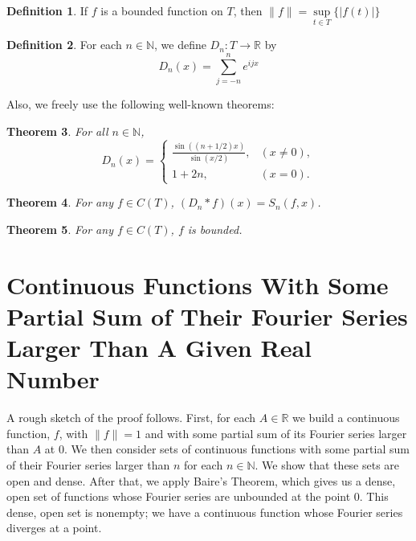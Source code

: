 \documentclass{amsart}
\newcommand{\N}{\mathbb{N}}
\newcommand{\R}{\mathbb{R}}
\newcommand{\absval}[1]{\left| #1 \right|}
\newcommand{\norm}[1]{\|#1\|}
\newtheorem{thm}{Theorem}[section]
\theoremstyle{definition}
\newtheorem{definition}[thm]{Definition}
\begin{document}
\begin{definition}
If $f$ is a bounded function on $T$, then $\norm{f} = \sup\limits_{t \in T} \{\absval{f(t)}\}$
\end{definition}

\begin{definition}
For each $n \in \N$, we define $D_n: T \to \R$ by
\begin{displaymath}
   D_n(x) = \sum\limits_{j=-n}^n e^{ijx}
\end{displaymath} 
\end{definition}




Also, we freely use the following well-known theorems:

\begin{thm}
For all $n \in \N$, 
\begin{displaymath}
   D_n(x) = \left\{
     \begin{array}{lr}
       \frac{\sin((n+1/2)x)}{\sin(x/2)}, &(x \neq 0),\\
       1+2n, &(x=0).
     \end{array}
   \right.
\end{displaymath}
\end{thm}

\begin{thm}
For any $f \in C(T)$, $(D_n \ast f)(x) = S_n(f,x)$. 
\end{thm}

\begin{thm}
For any $f \in C(T)$, $f$ is bounded.
\end{thm}

\section{Continuous Functions With Some Partial Sum of Their Fourier Series Larger Than A Given Real Number}

A rough sketch of the proof follows. 
First, for each $A \in \R$ we build a continuous function, $f$, with $\norm{f} = 1$ and with some partial sum of its Fourier series larger than $A$ at $0$. 
We then consider sets of continuous functions with some partial sum of their Fourier series larger than $n$ for each $n \in \N$.
We show that these sets are open and dense. 
After that, we apply Baire's Theorem, which gives us a dense, open set of functions whose Fourier series are unbounded at the point $0$. 
This dense, open set is nonempty; we have a continuous function whose Fourier series diverges at a point.
\end{document}
